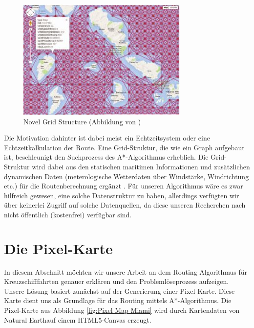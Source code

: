 \documentclass[letterpaper]{article}
\begin{document}
	\begin{figure}[!htbp]
		\centering
		\includegraphics[width=.8\linewidth]{novel_grid_structure}
		\caption{Novel Grid Structure (Abbildung von \cite{makrygiorgos15})}
		\label{fig:novel grid structure}
	\end{figure}

	Die Motivation dahinter ist dabei meist ein Echtzeitsystem oder eine Echtzeitkalkulation der Route. Eine Grid-Struktur, die wie ein Graph aufgebaut ist, beschleunigt den Suchprozess des A*-Algorithmus erheblich\cite{patel16}. Die Grid-Struktur wird dabei aus den statischen maritimen Informationen und zusätzlichen dynamischen Daten (meterologische Wetterdaten über Windstärke, Windrichtung etc.) für die Routenberechnung ergänzt \cite[s. 2]{makrygiorgos15}.
	Für unseren Algorithmus wäre es zwar hilfreich gewesen, eine solche Datenstruktur zu haben, allerdings verfügten wir über keinerlei Zugriff auf solche Datenquellen, da diese unseren Recherchen nach nicht öffentlich (kostenfrei) verfügbar sind.

\section{Die Pixel-Karte}
	In diesem Abschnitt möchten wir unsere Arbeit an dem Routing Algorithmus für Kreuzschifffahrten genauer erklären und den Problemlöseprozess aufzeigen. Unsere Lösung basiert zunächst auf der Generierung einer Pixel-Karte. Diese Karte dient uns als Grundlage für das Routing mittels A*-Algorithmus. Die Pixel-Karte aus Abbildung \ref{fig:Pixel Map Miami} wird durch Kartendaten von Natural Earth\footnotemark auf einem HTML5-Canvas erzeugt. 

\end{document}
